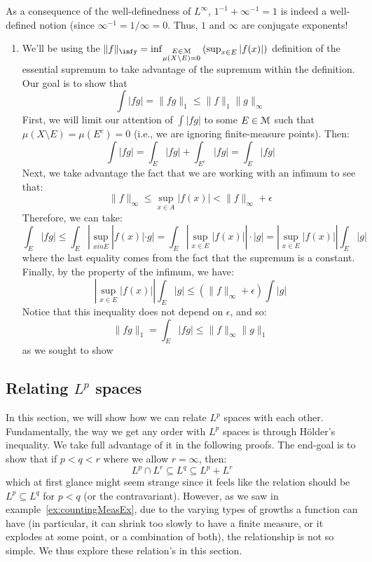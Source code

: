 \documentclass[oneside]{book}
\newcommand{\EM}{\EuScript{M}}
\newcommand{\sse}{\subseteq}
\begin{document}
As a consequence of the well-definedness of $L^\infty$, $1^{-1} + \infty^{-1} = 1$ is indeed a well-defined notion
(since $\infty^{-1} = 1/\infty = 0$. Thus, $1$ and $\infty$ are conjugate exponents!
\begin{Proof}
	\begin{enumerate}
		\item We'll be using the $\|f\|_\infy = \inf_{\substack{E \in \EM\\ \mu(X\setminus E) = 0}}\left(\sup_{x \in E}
			|f(x)|\right)$ definition of the essential supremum to take advantage of the supremum within the definition.
			Our goal is to show that 
			\[
				\int |fg| = \|fg\|_1 \le \|f\|_1\|g\|_\infty
			\]
			First, we will limit our attention of $\int |fg|$ to some $E \in \EM$ such that $\mu(X\setminus E)
			= \mu(E^c) = 0$ (i.e., we are ignoring finite-measure points). Then:
			\[
				\int |fg| = \int_{E} |fg| + \int_{E^c} |fg| = \int_E |fg|
			\]
			Next, we take advantage the fact that we are working with an infimum to see that:
			\[
				\|f\|_\infty \le \sup_{x \in A} |f(x)| < \|f\|_\infty + \epsilon
			\]
			Therefore, we can take:
			\[
				\int_E |fg| \le \int_E |\sup_{x in E}|f(x)|\cdot g| = \int_E \left|\sup_{x \in E}|f(x)|\right|\cdot |g|
				= \left|\sup_{x \in E}|f(x)|\right|\int_E |g|
			\]
			where the last equality comes from the fact that the supremum is a constant. Finally, by the property of the
			infimum, we have:
			\[
				\left|\sup_{x \in E}|f(x)|\right|\int_E |g| \le (\|f\|_\infty + \epsilon)\int |g|
			\]
			Notice that this inequality does not depend on $\epsilon$, and so:
			\[
				\|fg\|_1 = \int_E |fg| \le  \|f\|_\infty\|g\|_1
			\]
			as we sought to show
	\end{enumerate}
\end{Proof}

\subsection[Relating Lp sapces]{Relating $L^p$ spaces}

In this section, we will show how we can relate $L^p$ spaces with each other. Fundamentally, the way we get any order
with $L^p$ spaces is through H\"older's inequality. We take full advantage of it in the following proofs. The end-goal
is to show that if $p < q < r$ where we allow $r = \infty$, then:
\[
	L^p \cap L^r \sse L^q \sse L^p + L^r
\]
which at first glance might seem strange since it feels like the relation should be $L^p \sse L^q$ for $p < q$ (or the
contravariant). However, as we saw in example~\ref{ex:countingMeasEx}, due to the varying types of growths a function
can have (in particular, it can shrink too slowly to have a finite measure, or it explodes at some point, or
a combination of both), the relationship is not so simple. We thus explore these relation's in this section. 
\end{document}
